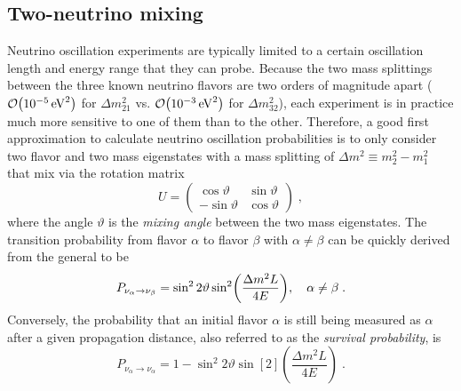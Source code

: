 \subsection{Two-neutrino mixing}
Neutrino oscillation experiments are typically limited to a certain oscillation length and energy range that they can probe. Because the two mass splittings between the three known neutrino flavors are two orders of magnitude apart ($\order{\SI{e-5}{eV^2}}$ for $\Delta m^2_{21}$ vs. $\order{\SI{e-3}{eV^2}}$ for $\Delta m^2_{32}$), each experiment is in practice much more sensitive to one of them than to the other.
Therefore, a good first approximation to calculate neutrino oscillation probabilities is to only consider two flavor and two mass eigenstates with a mass splitting of $\Delta m^2 \equiv m_2^2 - m_1^2$ that mix via the rotation matrix
\begin{equation}
    U =
    \begin{pmatrix}
        \cos \vartheta & \sin \vartheta \\
        -\sin \vartheta & \cos \vartheta
    \end{pmatrix}\;,\label{eq:two-flav-pmns}
\end{equation}
where the angle $\vartheta$ is the \emph{mixing angle} between the two mass eigenstates.
The transition probability from flavor $\alpha$ to flavor $\beta$ with $\alpha \neq \beta$ can be quickly derived from the general  to be
\begin{equation}
    P_{\nu_\alpha \rightarrow \nu_\beta} = \sin^2 2\vartheta \sin[2](\frac{\Delta m^2L}{4E})\qc\alpha \neq \beta\;.
\end{equation}
Conversely, the probability that an initial flavor $\alpha$ is still being measured as $\alpha$ after a given propagation distance, also referred to as the \emph{survival probability}, is
\begin{equation}
    P_{\nu_\alpha \rightarrow \nu_\alpha} = 1 - \sin^2 2\vartheta \sin[2](\frac{\Delta m^2L}{4E})\;.
\end{equation}


